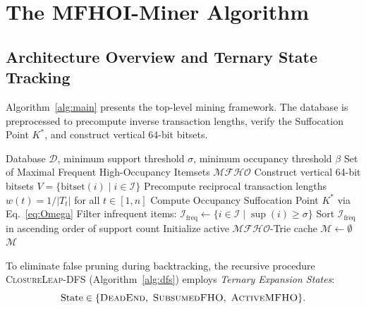 \documentclass[runningheads,orivec]{llncs}
\newcommand{\supp}{\operatorname{sup}}
\newcommand{\MFHO}{\ensuremath{\mathcal{MFHO}}}
\newcommand{\MFHOI}{\ensuremath{\mathcal{MFHO}}}
\begin{document}
\section{The MFHOI-Miner Algorithm}
\label{sec:algo}

\subsection{Architecture Overview and Ternary State Tracking}

Algorithm~\ref{alg:main} presents the top-level mining framework. The database is preprocessed to precompute inverse transaction lengths, verify the Suffocation Point $K^*$, and construct vertical 64-bit bitsets.

\begin{algorithm}[htbp]
\caption{\textsc{MFHOI-Miner}}
\label{alg:main}
\begin{algorithmic}[1]
\Require Database $\mathcal{D}$, minimum support threshold $\sigma$, minimum occupancy threshold $\beta$
\Ensure Set of Maximal Frequent High-Occupancy Itemsets $\MFHOI$
\State Construct vertical 64-bit bitsets $V = \{\text{bitset}(i) \mid i \in \mathcal{I}\}$
\State Precompute reciprocal transaction lengths $w(t) = 1/|T_t|$ for all $t \in [1, n]$
\State Compute Occupancy Suffocation Point $K^*$ via Eq.~\eqref{eq:Omega}
\State Filter infrequent items: $\mathcal{I}_{\text{freq}} \gets \{i \in \mathcal{I} \mid \supp(i) \ge \sigma\}$
\State Sort $\mathcal{I}_{\text{freq}}$ in ascending order of support count
\State Initialize active \MFHO{}-Trie cache $\mathcal{M} \gets \emptyset$
\State {}
\State \Return $\mathcal{M}$
\end{algorithmic}
\end{algorithm}

To eliminate false pruning during backtracking, the recursive procedure \textsc{ClosureLeap-DFS} (Algorithm~\ref{alg:dfs}) employs \emph{Ternary Expansion States}:
\begin{equation}
\mathrm{State} \in \{\textsc{DeadEnd}, \ \textsc{SubsumedFHO}, \ \textsc{ActiveMFHO}\}.
\end{equation}
\end{document}
